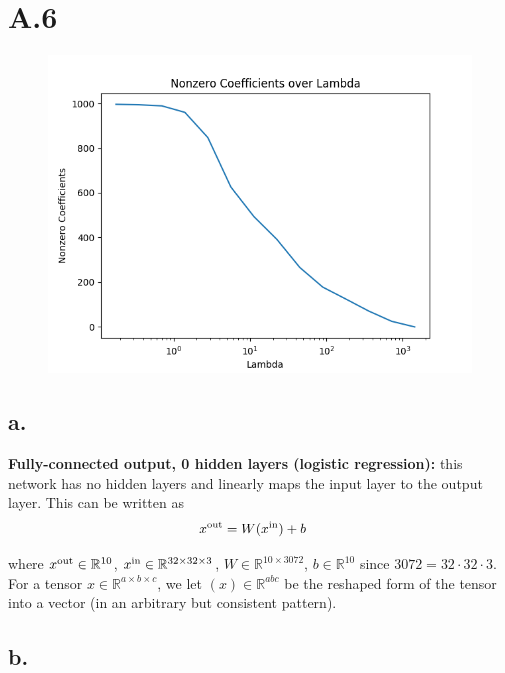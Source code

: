 \documentclass{article}
\newcommand{\field}[1]{\mathbb{#1}}
\newcommand{\1}{\mathbf{1}}
\newcommand{\R}{\field{R}} %
\begin{document}
\section*{A.6}
{\Large 

\begin{figure}[h]
  \centering
  \includegraphics[width=120mm]{../hw2-code/results/a4_a.png}
\end{figure}


\subsection*{a.}

\textbf{Fully-connected output, 0 hidden layers (logistic regression):} this network has no hidden layers and linearly maps the input layer to the output layer. This can be written as 
  \begin{align*}
    x^{\rm out} &= W (x^{\rm in}) +b
  \end{align*} 
  
  where $x^{\rm out} \in \R^{10}$, $x^{\rm in} \in \R^{32 \times 32 \times 3}$, $W \in \R^{10 \times 3072}$, $b \in \R^{10}$ since $3072 = 32 \cdot 32 \cdot 3$. For a tensor $x \in \R^{a \times b \times c}$, we let $(x) \in \R^{a b c}$ be the reshaped form of the tensor into a vector (in an arbitrary but consistent pattern).

\subsection*{b.}

}
\end{document}
